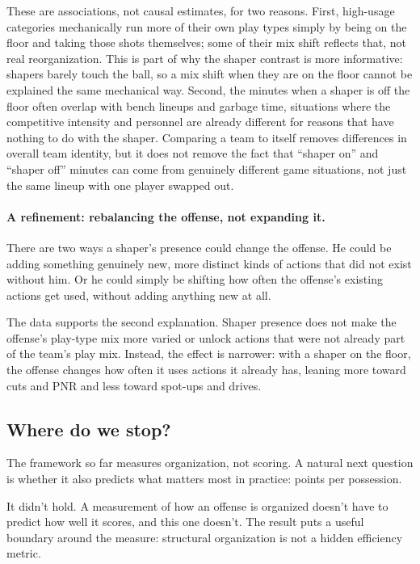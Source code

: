 \documentclass[11pt]{article}
\begin{document}
These are associations, not causal estimates, for two reasons. First, high-usage categories
mechanically run more of their own play types simply by being on the floor and taking those
shots themselves; some of their mix shift reflects that, not real reorganization. This is
part of why the shaper contrast is more informative: shapers barely touch the ball, so a mix
shift when they are on the floor cannot be explained the same mechanical way. Second, the
minutes when a shaper is off the floor often overlap with bench lineups and garbage time,
situations where the competitive intensity and personnel are already different for reasons
that have nothing to do with the shaper. Comparing a team to itself removes differences in
overall team identity, but it does not remove the fact that ``shaper on'' and ``shaper off''
minutes can come from genuinely different game situations, not just the same lineup with one
player swapped out.

\paragraph{A refinement: rebalancing the offense, not expanding it.}
There are two ways a shaper's presence could change the offense. He could be adding something
genuinely new, more distinct kinds of actions that did not exist without him. Or he could
simply be shifting how often the offense's existing actions get used, without adding anything
new at all.

The data supports the second explanation. Shaper presence does not make the offense's
play-type mix more varied or unlock actions that were not already part of the team's play
mix. Instead, the effect is narrower: with a shaper on the floor, the offense changes how
often it uses actions it already has, leaning more toward cuts and PNR and less toward
spot-ups and drives.

\subsection{Where do we stop?}
\label{sec:efficiency}

The framework so far measures organization, not scoring. A natural next question is whether
it also predicts what matters most in practice: points per possession.

It didn't hold. A measurement of how an offense is organized doesn't have to predict how
well it scores, and this one doesn't. The result puts a useful boundary around the measure:
structural organization is not a hidden efficiency metric.
\end{document}
